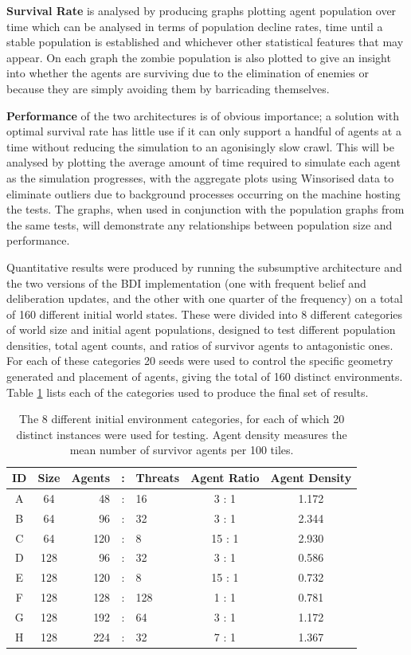 \documentclass[a4paper,12pt]{article}
\begin{document}
\textbf{Survival Rate} is analysed by producing graphs plotting agent population over time which can be analysed in terms of population decline rates, time until a stable population is established and whichever other statistical features that may appear. On each graph the zombie population is also plotted to give an insight into whether the agents are surviving due to the elimination of enemies or because they are simply avoiding them by barricading themselves.

\textbf{Performance} of the two architectures is of obvious importance; a solution with optimal survival rate has little use if it can only support a handful of agents at a time without reducing the simulation to an agonisingly slow crawl. This will be analysed by plotting the average amount of time required to simulate each agent as the simulation progresses, with the aggregate plots using Winsorised data to eliminate outliers due to background processes occurring on the machine hosting the tests. The graphs, when used in conjunction with the population graphs from the same tests, will demonstrate any relationships between population size and performance.

Quantitative results were produced by running the subsumptive architecture and the two versions of the BDI implementation (one with frequent belief and deliberation updates, and the other with one quarter of the frequency) on a total of 160 different initial world states. These were divided into 8 different categories of world size and initial agent populations, designed to test different population densities, total agent counts, and ratios of survivor agents to antagonistic ones. For each of these categories 20 seeds were used to control the specific geometry generated and placement of agents, giving the total of 160 distinct environments. Table \ref{tab:environs} lists each of the categories used to produce the final set of results.

\begin{table}[ht]
\centering
\begin{tabular}{|c|c|rcl|c|c|} \hline
{\bf ID} & {\bf Size} & {\bf Agents} & : & {\bf Threats} & {\bf Agent Ratio} & {\bf Agent Density} \\ \hline
A & 64 & 48 & : & 16 & 3 : 1 & 1.172 \\
B & 64 & 96 & : & 32 & 3 : 1 & 2.344 \\
C & 64 & 120 & : & 8 & 15 : 1 & 2.930 \\ \hline
D & 128 & 96 & : & 32 & 3 : 1 & 0.586 \\
E & 128 & 120 & : & 8 & 15 : 1 & 0.732 \\
F & 128 & 128 & : & 128 & 1 : 1 & 0.781 \\
G & 128 & 192 & : & 64 & 3 : 1 & 1.172 \\
H & 128 & 224 & : & 32 & 7 : 1 & 1.367 \\ \hline
\end{tabular}
\caption{The 8 different initial environment categories, for each of which 20 distinct instances were used for testing. Agent density measures the mean number of survivor agents per 100 tiles.}
\label{tab:environs}
\end{table}
\end{document}
